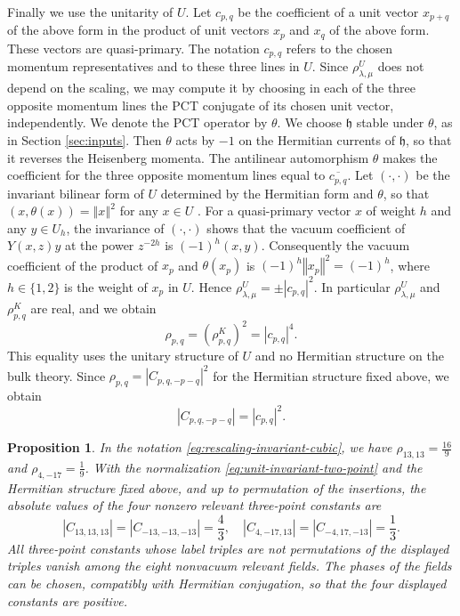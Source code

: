 \documentclass[leqno]{article}
\newcommand{\norm}[1]{\left\Vert#1\right\Vert}
\newtheorem{prop}[thm]{Proposition}
\numberwithin{equation}{section}
\begin{document}
Finally we use the unitarity of $U$. Let $c_{p,q}$ be the coefficient of a unit vector $x_{p+q}$ of the above form in the product of unit vectors $x_p$ and $x_q$ of the above form. These vectors are quasi-primary. The notation $c_{p,q}$ refers to the chosen momentum representatives and to these three lines in $U$. Since $\rho^U_{\lambda,\mu}$ does not depend on the scaling, we may compute it by choosing in each of the three opposite momentum lines the PCT conjugate of its chosen unit vector, independently. We denote the PCT operator by $\theta$. We choose $\mathfrak h$ stable under $\theta$, as in Section \ref{sec:inputs}. Then $\theta$ acts by $-1$ on the Hermitian currents of $\mathfrak h$, so that it reverses the Heisenberg momenta. The antilinear automorphism $\theta$ makes the coefficient for the three opposite momentum lines equal to $\overline{c_{p,q}}$. Let $(\cdot,\cdot)$ be the invariant bilinear form of $U$ determined by the Hermitian form and $\theta$, so that $(x,\theta(x)) = \norm{x}^2$ for any $x \in U$ \cite[Section 5]{CKLW18}. For a quasi-primary vector $x$ of weight $h$ and any $y \in U_h$, the invariance of $(\cdot,\cdot)$ shows that the vacuum coefficient of $Y(x,z)y$ at the power $z^{-2h}$ is $(-1)^h(x,y)$. Consequently the vacuum coefficient of the product of $x_p$ and $\theta(x_p)$ is $(-1)^h\norm{x_p}^2 = (-1)^h$, where $h \in \{1,2\}$ is the weight of $x_p$ in $U$. Hence $\rho^U_{\lambda,\mu} = \pm|c_{p,q}|^2$. In particular $\rho^U_{\lambda,\mu}$ and $\rho^K_{p,q}$ are real, and we obtain
\[
\rho_{p,q} = (\rho^K_{p,q})^2 = |c_{p,q}|^4.
\]
This equality uses the unitary structure of $U$ and no Hermitian structure on the bulk theory. Since $\rho_{p,q} = |C_{p,q,-p-q}|^2$ for the Hermitian structure fixed above, we obtain
\begin{equation}
\label{eq:bulk-chiral-coefficient-square}
|C_{p,q,-p-q}| = |c_{p,q}|^2.
\end{equation}

\begin{prop}
\label{prop:normalized-haagerup-cubic-coefficients}
In the notation \eqref{eq:rescaling-invariant-cubic}, we have $\rho_{13,13} = \frac{16}9$ and $\rho_{4,-17} = \frac19$. With the normalization \eqref{eq:unit-invariant-two-point} and the Hermitian structure fixed above, and up to permutation of the insertions, the absolute values of the four nonzero relevant three-point constants are
\[
|C_{13,13,13}| = |C_{-13,-13,-13}| = \frac43,
\quad
|C_{4,-17,13}| = |C_{-4,17,-13}| = \frac13.
\]
All three-point constants whose label triples are not permutations of the displayed triples vanish among the eight nonvacuum relevant fields. The phases of the fields can be chosen, compatibly with Hermitian conjugation, so that the four displayed constants are positive.
\end{prop}
\end{document}
